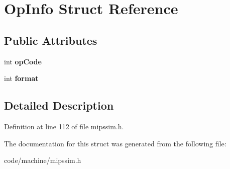 \section{Op\+Info Struct Reference}
\label{struct_op_info}
\subsection*{Public Attributes}
\begin{DoxyCompactItemize}
\item 
int {\bfseries op\+Code}\label{struct_op_info_ae9879a2920b1ee78b2c25985eed94db9}

\item 
int {\bfseries format}\label{struct_op_info_a9b1a1704e5b5d3ccbf063c8481f31fbe}

\end{DoxyCompactItemize}


\subsection{Detailed Description}


Definition at line 112 of file mipssim.\+h.



The documentation for this struct was generated from the following file\+:\begin{DoxyCompactItemize}
\item 
code/machine/mipssim.\+h\end{DoxyCompactItemize}
